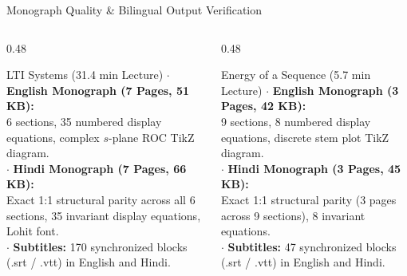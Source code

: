 \documentclass[aspectratio=169,10pt]{beamer}
\begin{document}
\begin{frame}{Monograph Quality \& Bilingual Output Verification}
  \begin{columns}[T]
    \begin{column}{0.48\textwidth}
      \begin{block}{LTI Systems (31.4 min Lecture)}
        \footnotesize
        $\cdot$ \textbf{English Monograph (7 Pages, 51 KB):}\\
        6 sections, 35 numbered display equations, complex $s$-plane ROC TikZ diagram.\\
        \vspace{0.3em}
        $\cdot$ \textbf{Hindi Monograph (7 Pages, 66 KB):}\\
        Exact 1:1 structural parity across all 6 sections, 35 invariant display equations, Lohit font.\\
        \vspace{0.3em}
        $\cdot$ \textbf{Subtitles:} 170 synchronized blocks (.srt / .vtt) in English and Hindi.
      \end{block}
    \end{column}
    \begin{column}{0.48\textwidth}
      \begin{block}{Energy of a Sequence (5.7 min Lecture)}
        \footnotesize
        $\cdot$ \textbf{English Monograph (3 Pages, 42 KB):}\\
        9 sections, 8 numbered display equations, discrete stem plot TikZ diagram.\\
        \vspace{0.3em}
        $\cdot$ \textbf{Hindi Monograph (3 Pages, 45 KB):}\\
        Exact 1:1 structural parity (3 pages across 9 sections), 8 invariant equations.\\
        \vspace{0.3em}
        $\cdot$ \textbf{Subtitles:} 47 synchronized blocks (.srt / .vtt) in English and Hindi.
      \end{block}
    \end{column}
  \end{columns}
\end{frame}
\end{document}
